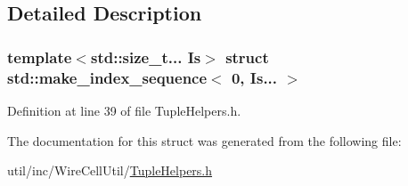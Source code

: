 \subsection{Detailed Description}
\subsubsection*{template$<$std\+::size\+\_\+t... Is$>$\newline
struct std\+::make\+\_\+index\+\_\+sequence$<$ 0, Is... $>$}



Definition at line 39 of file Tuple\+Helpers.\+h.



The documentation for this struct was generated from the following file\+:\begin{DoxyCompactItemize}
\item 
util/inc/\+Wire\+Cell\+Util/\hyperlink{_tuple_helpers_8h}{Tuple\+Helpers.\+h}\end{DoxyCompactItemize}

